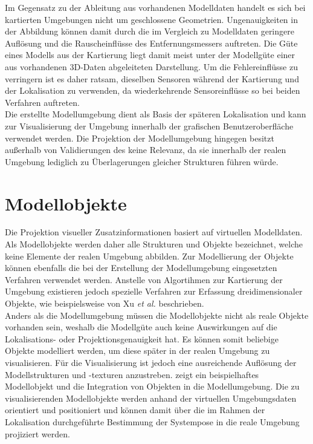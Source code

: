 Im Gegensatz zu der Ableitung aus vorhandenen Modelldaten handelt es sich bei kartierten Umgebungen nicht um geschlossene Geometrien. Ungenauigkeiten in der Abbildung können damit durch die im Vergleich zu Modelldaten geringere Auflösung und die Rauscheinflüsse des Entfernungsmessers auftreten. Die Güte eines Modells aus der Kartierung liegt damit meist unter der Modellgüte einer aus vorhandenen 3D-Daten abgeleiteten Darstellung. Um die Fehlereinflüsse zu verringern ist es daher ratsam, dieselben Sensoren während der Kartierung und der Lokalisation zu verwenden, da wiederkehrende Sensoreinflüsse so bei beiden Verfahren auftreten.\\

Die erstellte Modellumgebung dient als Basis der späteren Lokalisation und kann zur Visualisierung der Umgebung innerhalb der grafischen Benutzeroberfläche verwendet werden. Die Projektion der Modellumgebung hingegen besitzt außerhalb von Validierungen des  keine Relevanz, da sie innerhalb der realen Umgebung lediglich zu Überlagerungen gleicher Strukturen führen würde.

\section{Modellobjekte}
Die Projektion visueller Zusatzinformationen basiert auf virtuellen Modelldaten. Als Modellobjekte werden daher alle Strukturen und Objekte bezeichnet, welche keine Elemente der realen Umgebung abbilden. Zur Modellierung der Objekte können ebenfalls die bei der Erstellung der Modellumgebung eingesetzten Verfahren verwendet werden. Anstelle von Algortihmen zur Kartierung der Umgebung existieren jedoch spezielle Verfahren zur Erfassung dreidimensionaler Objekte, wie beispielsweise von Xu \textit{et al.} \cite{Xu2012} beschrieben.\\

Anders als die Modellumgebung müssen die Modellobjekte nicht als reale Objekte vorhanden sein, weshalb die Modellgüte auch keine Auswirkungen auf die Lokalisations- oder Projektionsgenauigkeit hat. Es können somit beliebige Objekte modelliert werden, um diese später in der realen Umgebung zu visualisieren.  Für die Visualisierung ist jedoch eine ausreichende Auflösung der Modellstrukturen und -texturen anzustreben.  zeigt ein beispielhaftes Modellobjekt und die Integration von Objekten in die Modellumgebung. Die zu visualisierenden Modellobjekte werden anhand der virtuellen Umgebungsdaten orientiert und positioniert und können damit über die im Rahmen der Lokalisation durchgeführte Bestimmung der Systempose in die reale Umgebung projiziert werden.

